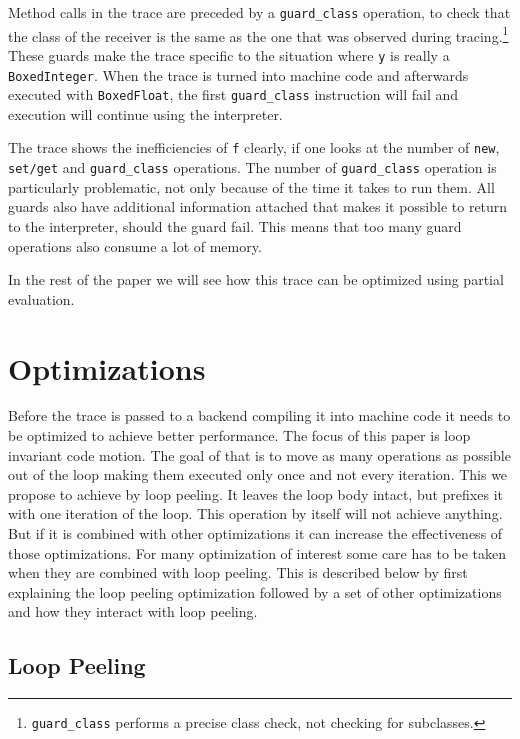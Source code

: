 \documentclass[preprint]{sigplanconf}
\begin{document}
Method calls in the trace are preceded by a \lstinline{guard_class}
operation, to check that the class of the receiver is the same as the one that
was observed during tracing.\footnote{\lstinline{guard_class}
performs a precise
class check, not checking for subclasses.} These guards make the trace specific
to the situation where \lstinline{y} is really a \lstinline{BoxedInteger}. When
the trace is turned into machine code and afterwards executed with
\lstinline{BoxedFloat}, the
first \lstinline{guard_class} instruction will fail and execution will continue
using the interpreter.

The trace shows the inefficiencies of \lstinline{f} clearly, if one looks at
the number of \lstinline{new}, \lstinline{set/get} and \lstinline{guard_class}
operations. The number of \lstinline{guard_class} operation is particularly
problematic, not only because of the time it takes to run them. All guards also
have additional information attached that makes it possible to return to the
interpreter, should the guard fail. This means that too many guard operations also
consume a lot of memory.

In the rest of the paper we will see how this trace can be optimized using
partial evaluation.

\section{Optimizations}
Before the trace is passed to a backend compiling it into machine code
it needs to be optimized to achieve better performance.
The focus of this paper
is loop invariant code motion. The goal of that is to move as many
operations as possible out of the loop making them executed only once
and not every iteration. This we propose to achieve by loop peeling. It
leaves the loop body intact, but prefixes it with one iteration of the
loop. This operation by itself will not achieve anything. But if it is
combined with other optimizations it can increase the effectiveness of
those optimizations. For many optimization of interest some care has
to be taken when they are combined with loop peeling. This is
described below by first explaining the loop peeling optimization
followed by a set of other optimizations and how they interact with
loop peeling.

\subsection{Loop Peeling}
\end{document}
